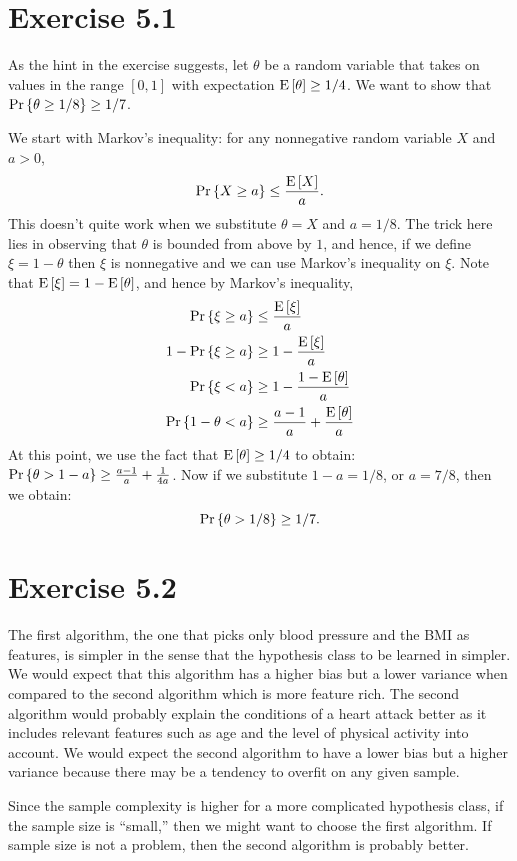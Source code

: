 \section*{Exercise 5.1}

As the hint in the exercise suggests, let $\theta$ be a random variable that takes
on values in the range $[0, 1]$ with expectation $\text{E} \left [ \theta \right ] \geq 1 / 4$. We 
want to show that $\text{Pr} \left \{ \theta \geq 1 / 8 \right \} \geq 1 / 7$.

We start with Markov's inequality: for any nonnegative random variable $X$ and $a > 0$,
\[
    \text{Pr} \left \{ X \geq a \right \} \leq \frac{\text{E} \left [ X \right ]}{a}.
\]
This doesn't quite work when we substitute $\theta = X$ and $a = 1 / 8$. The
trick here lies in observing that $\theta$ is bounded from above by $1$, and
hence, if we define $\xi = 1 - \theta$ then $\xi$ is nonnegative and we can use
Markov's inequality on $\xi$. Note that $\text{E} \left [ \xi \right ] =  1 - \text{E} \left [ \theta \right ]$,
and hence by Markov's inequality,
\begin{align*}
    \text{Pr} \left \{ \xi \geq a \right \} & \leq \frac{\text{E} \left [ \xi \right ]}{a} \\
    1 -  \text{Pr} \left \{ \xi \geq a \right \} & \geq 1 - \frac{\text{E} \left [ \xi \right ]}{a} \\
    \text{Pr} \left \{ \xi < a \right \} & \geq 1 - \frac{1 - \text{E} \left [ \theta \right ]}{a} \\
    \text{Pr} \left \{ 1 - \theta < a \right \} & \geq \frac{a - 1}{a} + \frac{\text{E} \left [ \theta \right ]}{a} 
\end{align*}   
At this point, we use the fact that $\text{E} \left [ \theta \right ] \geq 1 / 4$ to obtain:
$\text{Pr} \left \{ \theta > 1 - a \right \} \geq \frac{a - 1}{a} + \frac{1}{4a}$. Now if we substitute 
$1 - a =  1 / 8$, or $a = 7 / 8$, then we obtain:
\[
    \text{Pr} \left \{ \theta > 1 / 8 \right \} \geq 1 / 7.  
\] 

\section*{Exercise 5.2}

The first algorithm, the one that picks only blood pressure and the BMI as
features, is simpler in the sense that the hypothesis class to be learned in
simpler. We would expect that this algorithm has a higher bias but a lower
variance when compared to the second algorithm which is more feature rich. The second
algorithm would probably explain the conditions of a heart attack better as it
includes relevant features such as age and the level of physical activity into
account. We would expect the second algorithm to have a lower bias but a higher
variance because there may be a tendency to overfit on any given sample.

Since the sample complexity is higher for a more complicated hypothesis class, 
if the sample size is ``small,'' then we might want to choose the first algorithm.
If sample size is not a problem, then the second algorithm is probably better.  
